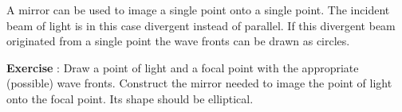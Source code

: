 A mirror can be used to image a single point onto a single point. The incident beam of light is in this case divergent instead of parallel. If this divergent beam originated from a single point the wave fronts can be drawn as circles.
\begin{shaded}
\textbf{Exercise \theExercise {}} : Draw a point of light and a focal point with the appropriate (possible) wave fronts. Construct the mirror needed to image the point of light onto the focal point. Its shape should be elliptical.\end{shaded}


